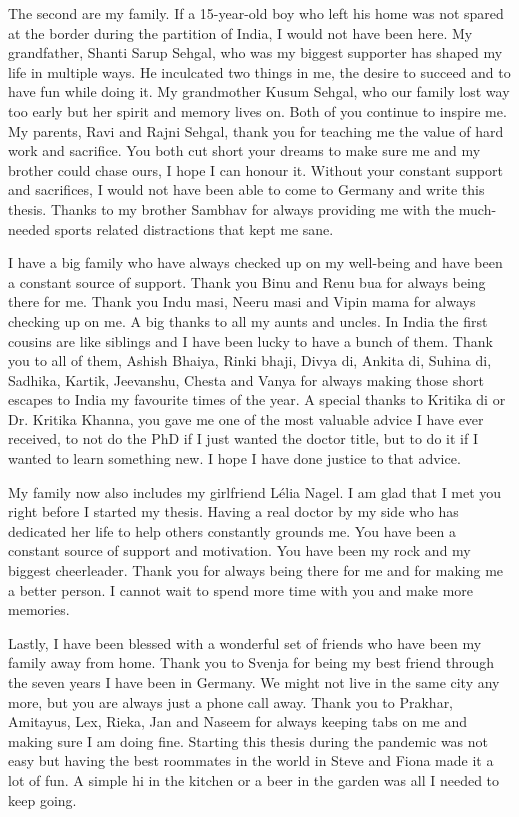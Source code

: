 The second are my family. If a 15-year-old boy who left his home was not spared at the border during the partition of India, I would not have been here. My grandfather, Shanti Sarup Sehgal, who was my biggest supporter has shaped my life in multiple ways. He inculcated two things in me, the desire to succeed and to have fun while doing it. My grandmother Kusum Sehgal, who our family lost way too early but her spirit and memory lives on. Both of you continue to inspire me. My parents, Ravi and Rajni Sehgal, thank you for teaching me the value of hard work and sacrifice. You both cut short your dreams to make sure me and my brother could chase ours, I hope I can honour it. Without your constant support and sacrifices, I would not have been able to come to Germany and write this thesis. Thanks to my brother Sambhav for always providing me with the much-needed sports related distractions that kept me sane. 

I have a big family who have always checked up on my well-being and have been a constant source of support. Thank you Binu and Renu bua for always being there for me. Thank you Indu masi, Neeru masi and Vipin mama for always checking up on me. A big thanks to all my aunts and uncles.
In India the first cousins are like siblings and I have been lucky to have a bunch of them. Thank you to all of them, Ashish Bhaiya, Rinki bhaji, Divya di, Ankita di, Suhina di, Sadhika, Kartik, Jeevanshu, Chesta and Vanya for always making those short escapes to India my favourite times of the year. A special thanks to Kritika di or Dr. Kritika Khanna, you gave me one of the most valuable advice I have ever received, to not do the PhD if I just wanted the doctor title, but to do it if I wanted to learn something new. I hope I have done justice to that advice.     

My family now also includes my girlfriend Lélia Nagel. I am glad that I met you right before I started my thesis. Having a real doctor by my side who has dedicated her life to help others constantly grounds me. You have been a constant source of support and motivation. You have been my rock and my biggest cheerleader. Thank you for always being there for me and for making me a better person. I cannot wait to spend more time with you and make more memories.

Lastly, I have been blessed with a wonderful set of friends who have been my family away from home. Thank you to Svenja for being my best friend through the seven years I have been in Germany. We might not live in the same city any more, but you are always just a phone call away. Thank you to Prakhar, Amitayus, Lex, Rieka, Jan and Naseem for always keeping tabs on me and making sure I am doing fine. Starting this thesis during the pandemic was not easy but having the best roommates in the world in Steve and Fiona made it a lot of fun. A simple hi in the kitchen or a beer in the garden was all I needed to keep going. 

